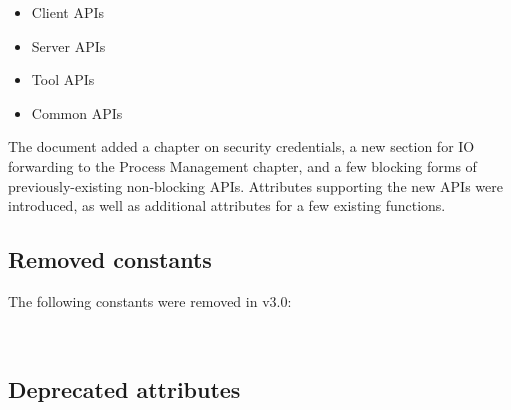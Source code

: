 \begin{itemize}
\item Client APIs
\item Server \acp{API}
\item Tool \acp{API}
\item Common \acp{API}
\end{itemize}

The document added a chapter on security credentials, a new section for \ac{IO} forwarding to the Process Management chapter, and a few blocking forms of previously-existing non-blocking \acp{API}. Attributes supporting the new \acp{API} were introduced, as well as additional attributes for a few existing functions.

\subsection{Removed constants}

The following constants were removed in v3.0:

\\

\subsection{Deprecated attributes}

